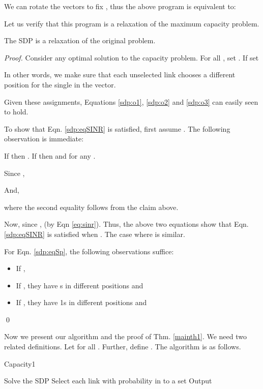 \documentclass[11pt]{amsart}
\begin{document}
We can rotate the vectors to fix , thus the above program is equivalent to:




Let us verify that this program is a relaxation of the maximum capacity problem. 
\begin{lemma}
The SDP is a relaxation of the original problem.
\end{lemma}
\begin{proof}
Consider any optimal solution  to the capacity problem.
For all , set . 
If  
set 

In other words, we make sure that each unselected link chooses a different position
for the single  in the vector. 

Given these assignments, Equations \ref{sdp:o1}, \ref{sdp:o2} and \ref{sdp:o3} can easily seen to hold.

To show that Eqn. \ref{sdp:eqSINR} is satisfied, first assume . The following observation is immediate:
\begin{claim}
If  then . If 
then  and  for any .
\end{claim}

Since ,

And,

where the second equality follows from the claim above.

Now, since ,  (by Eqn \ref{eq:sinr}). Thus, the above two equations show that Eqn. \ref{sdp:eqSINR} is satisfied when . The
case where  is similar.

For Eqn. \ref{sdp:eqSp}, the following observations suffice:
\begin{itemize}
\item If ,   
\item If , they have s in different positions and   
\item If , they have 1s in different positions and   
\end{itemize}
\qed
\end{proof}



Now we present our algorithm and the proof of Thm. \ref{mainth1}. We need two related definitions.
Let  for all . Further, define . The algorithm is as follows.


\begin{algorithm}                      \caption{Capacity1}          \label{alg1}                           \begin{algorithmic}[1]                    \STATE Solve the SDP
     \STATE Select each link  with probability  in to a set  
     \STATE Output 
\end{algorithmic}
\end{algorithm}
\end{document}
